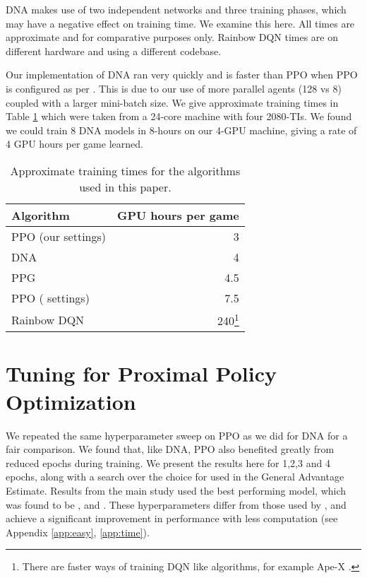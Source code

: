 \documentclass{article}
\begin{document}
DNA makes use of two independent networks and three training phases, which may have a negative effect on training time. We examine this here. All times are approximate and for comparative purposes only. Rainbow DQN times are on different hardware and using a different codebase.

Our implementation of DNA ran very quickly and is faster than PPO when PPO is configured as per \cite{schulman2017proximal}. This is due to our use of more parallel agents (128 vs 8) coupled with a larger mini-batch size. We give approximate training times in Table \ref{tab:training_times} which were taken from a 24-core machine with four 2080-TIs. We found we could train 8 DNA models in 8-hours on our 4-GPU machine, giving a rate of 4 GPU hours per game learned. 

\begin{table}[h]
    \caption{Approximate training times for the algorithms used in this paper.}
    \label{tab:training_times}
    \centering
    \begin{tabular}{l r}
        \toprule
        Algorithm & GPU hours per game \\ 
        \midrule
        PPO (our settings)      & 3  \\
        DNA                     & 4  \\
        PPG                     & 4.5  \\
        PPO (\cite{schulman2017proximal} settings)      & 7.5 \\        
        Rainbow DQN & 240\footnote{There are faster ways of training DQN like algorithms, for example Ape-X \cite{horgan2018distributed}.}\\
        \bottomrule
    \end{tabular}
    
\end{table}

\section{Tuning for Proximal Policy Optimization}
\label{app:PPO_tuning}

We repeated the same hyperparameter sweep on PPO as we did for DNA for a fair comparison. We found that, like DNA, PPO also benefited greatly from reduced epochs during training. We present the results here for 1,2,3 and 4 epochs, along with a search over the choice for  used in the General Advantage Estimate. Results from the main study used the best performing model, which was found to be , and . These hyperparameters differ from those used by \cite{schulman2017proximal}, and achieve a significant improvement in performance with less computation (see Appendix \ref{app:easy}, \ref{app:time}). 
\end{document}
